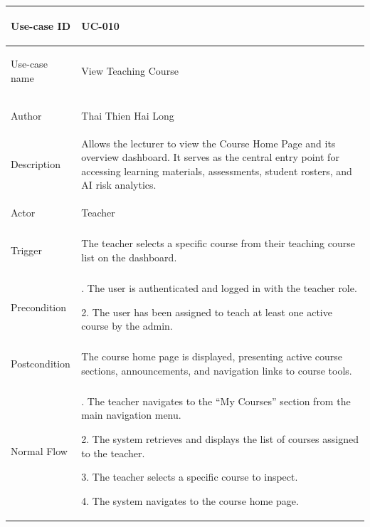 {
\renewcommand{\arraystretch}{1.1}
\setlength{\tabcolsep}{8pt}
\begin{longtable}{|>{\bfseries\raggedright\arraybackslash}p{}|>{\raggedright\arraybackslash}p{}|}
\hline
Use-case ID & UC-010 \\ \hline
Use-case name & View Teaching Course \\ \hline
Author & Thai Thien Hai Long \\ \hline
Description &
Allows the lecturer to view the Course Home Page and its overview dashboard. It serves as the central entry point for accessing learning materials, assessments, student rosters, and AI risk analytics.\\ \hline
Actor & Teacher \\ \hline
Trigger &
The teacher selects a specific course from their teaching course list on the dashboard. \\ \hline
Precondition &
1. The user is authenticated and logged in with the teacher role. \par
2. The user has been assigned to teach at least one active course by the admin. \\ \hline
Postcondition &
The course home page is displayed, presenting active course sections, announcements, and navigation links to course tools. \\ \hline
Normal Flow &
1. The teacher navigates to the ``My Courses'' section from the main navigation menu. \par
2. The system retrieves and displays the list of courses assigned to the teacher. \par
3. The teacher selects a specific course to inspect. \par
4. The system navigates to the course home page. \par

\end{longtable}}
